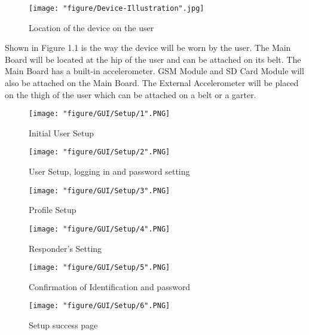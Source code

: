 \begin{figure}[htbp]
	\centering
		\texttt{[image: "figure/Device-Illustration".jpg]}
	\caption{Location of the device on the user}
	\label{fig:Device-Illustration}
\end{figure}

Shown in Figure 1.1 is the way the device will be worn by the user. The Main Board will be located at the hip of the user and can be attached on its belt. The Main Board has a built-in accelerometer. GSM Module and SD Card Module will also be attached on the Main Board. The External Accelerometer will be placed on the thigh of the user which can be attached on a belt or a garter.

\begin{figure}[htbp]
	\centering
		\texttt{[image: "figure/GUI/Setup/1".PNG]}
	\caption{Initial User Setup}
	\label{fig:1}
\end{figure}

\begin{figure}[htbp]
	\centering
		\texttt{[image: "figure/GUI/Setup/2".PNG]}
	\caption{User Setup, logging in and password setting}
	\label{fig:2}
\end{figure}

\begin{figure}[htbp]
	\centering
		\texttt{[image: "figure/GUI/Setup/3".PNG]}
	\caption{Profile Setup}
	\label{fig:3}
\end{figure}

\begin{figure}[htbp]
	\centering
		\texttt{[image: "figure/GUI/Setup/4".PNG]}
	\caption{Responder's Setting}
	\label{fig:4}
\end{figure}

\begin{figure}[htbp]
	\centering
		\texttt{[image: "figure/GUI/Setup/5".PNG]}
	\caption{Confirmation of Identification and password}
	\label{fig:5}
\end{figure}

\begin{figure}
	\centering
		\texttt{[image: "figure/GUI/Setup/6".PNG]}
	\caption{Setup success page}
	\label{fig:6}
\end{figure}

